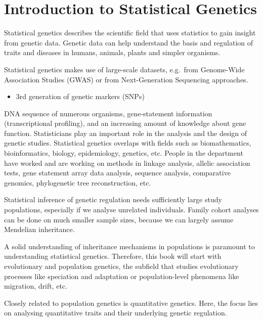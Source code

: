\documentclass[12pt,]{krantz}
\providecommand{\tightlist}{%
  \setlength{\itemsep}{0pt}\setlength{\parskip}{0pt}}
\renewenvironment{quote}{\begin{VF}}{\end{VF}}
\theoremstyle{definition}
\theoremstyle{definition}
\theoremstyle{definition}
\theoremstyle{remark}
\begin{document}
\mainmatter

\chapter{Introduction to Statistical
Genetics}\label{introduction-to-statistical-genetics}

Statistical genetics describes the scientific field that uses statistics
to gain insight from genetic data. Genetic data can help understand the
basis and regulation of traits and diseases in humans, animals, plants
and simpler organisms.

Statistical genetics makes use of large-scale datasets, e.g.~from
Genome-Wide Association Studies (GWAS) or from Next-Generation
Sequencing approaches.

\begin{itemize}
\tightlist
\item
  3rd generation of genetic markers (SNPs)
\end{itemize}

\begin{quote}
DNA sequence of numerous organisms, gene-statement information
(transcriptional profiling), and an increasing amount of knowledge about
gene function. Statisticians play an important role in the analysis and
the design of genetic studies. Statistical genetics overlaps with fields
such as biomathematics, bioinformatics, biology, epidemiology, genetics,
etc. People in the department have worked and are working on methods in
linkage analysis, allelic association tests, gene statement array data
analysis, sequence analysis, comparative genomics, phylogenetic tree
reconstruction, etc.
\end{quote}

Statistical inference of genetic regulation needs sufficiently large
study populations, especially if we analyse unrelated individuals.
Family cohort analyses can be done on much smaller sample sizes, because
we can largely assume Mendelian inheritance.

A solid understanding of inheritance mechanisms in populations is
paramount to understanding statistical genetics. Therefore, this book
will start with evolutionary and population genetics, the subfield that
studies evolutionary processes like speciation and adaptation or
population-level phenomena like migration, drift, etc.

Closely related to population genetics is quantitative genetics. Here,
the focus lies on analysing quantitative traits and their underlying
genetic regulation.
\end{document}
